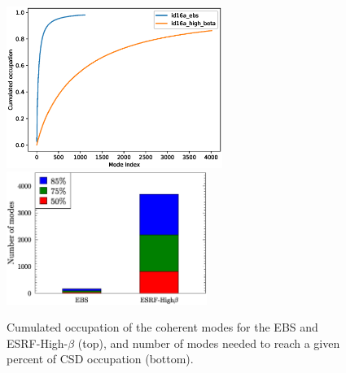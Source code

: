 \documentclass{iucr}              %
\begin{document}
\begin{figure}\label{fig:histomodes}
    \centering
        \includegraphics[width=7cm]{GRAPHICS/cumulated_occupation.eps}
        \includegraphics[width=6.5cm]{GRAPHICS/up_to_mode_id16a.eps}
    \caption{Cumulated occupation of the coherent modes for the EBS and ESRF-High-$\beta$ (top), and number of modes needed to reach a given percent of CSD occupation (bottom). }
\end{figure}
\end{document}

